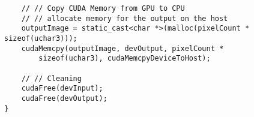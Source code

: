 \documentclass{article}
\begin{document}
\begin{enumerate}
\begin{itemize}
\begin{verbatim}
    // // Copy CUDA Memory from GPU to CPU
    // // allocate memory for the output on the host
    outputImage = static_cast<char *>(malloc(pixelCount * sizeof(uchar3)));  
    cudaMemcpy(outputImage, devOutput, pixelCount * 
        sizeof(uchar3), cudaMemcpyDeviceToHost);   

    // // Cleaning
    cudaFree(devInput);
    cudaFree(devOutput);
}        
    \end{verbatim}    
    \end{itemize}
    

\end{enumerate}
\end{document}
